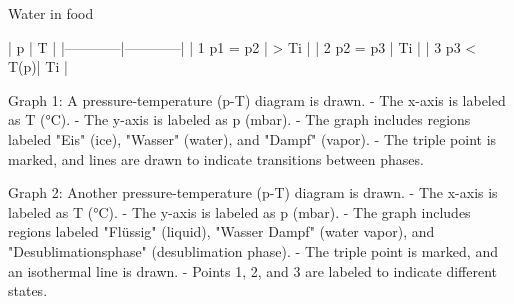 Water in food  

| p          | T          |  
|------------|------------|  
| 1 p1 = p2  | > Ti       |  
| 2 p2 = p3  | Ti         |  
| 3 p3 < T(p)| Ti         |  

Graph 1:  
A pressure-temperature (p-T) diagram is drawn.  
- The x-axis is labeled as T (°C).  
- The y-axis is labeled as p (mbar).  
- The graph includes regions labeled "Eis" (ice), "Wasser" (water), and "Dampf" (vapor).  
- The triple point is marked, and lines are drawn to indicate transitions between phases.  

Graph 2:  
Another pressure-temperature (p-T) diagram is drawn.  
- The x-axis is labeled as T (°C).  
- The y-axis is labeled as p (mbar).  
- The graph includes regions labeled "Flüssig" (liquid), "Wasser Dampf" (water vapor), and "Desublimationsphase" (desublimation phase).  
- The triple point is marked, and an isothermal line is drawn.  
- Points 1, 2, and 3 are labeled to indicate different states.